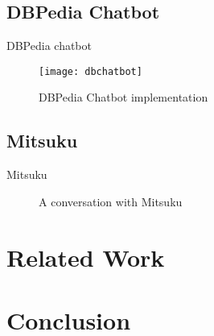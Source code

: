 \newpage
\subsection{DBPedia Chatbot}
DBPedia chatbot

\begin{figure}[h]
	\centering
	\texttt{[image: dbchatbot]}
	\caption{DBPedia Chatbot implementation}
	\label{fig:dbchatbot}
\end{figure}

\newpage
\subsection{Mitsuku}
\label{subsec:Mitsuku}
Mitsuku

\begin{figure}[h]
	\centering
	\qquad
	\caption{A conversation with Mitsuku}
	\label{fig:mitsuku}
\end{figure}


\newpage
\section{Related Work}

\section{Conclusion}





